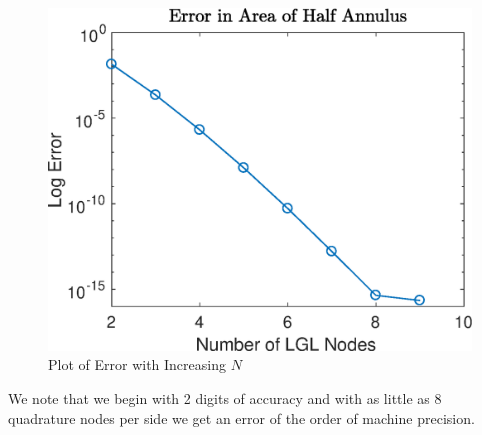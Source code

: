 \documentclass{article}
\begin{document}
\begin{figure}[H]
  \centering
  \includegraphics[scale=0.7]{media/annulus_line.eps}
  \caption{Plot of Error with Increasing $N$}
  \label{fig:line_plot}
\end{figure}
\noindent We note that we begin with 2 digits of accuracy and with as little as 8 quadrature nodes per side we get an error of the order of machine precision.
\end{document}
